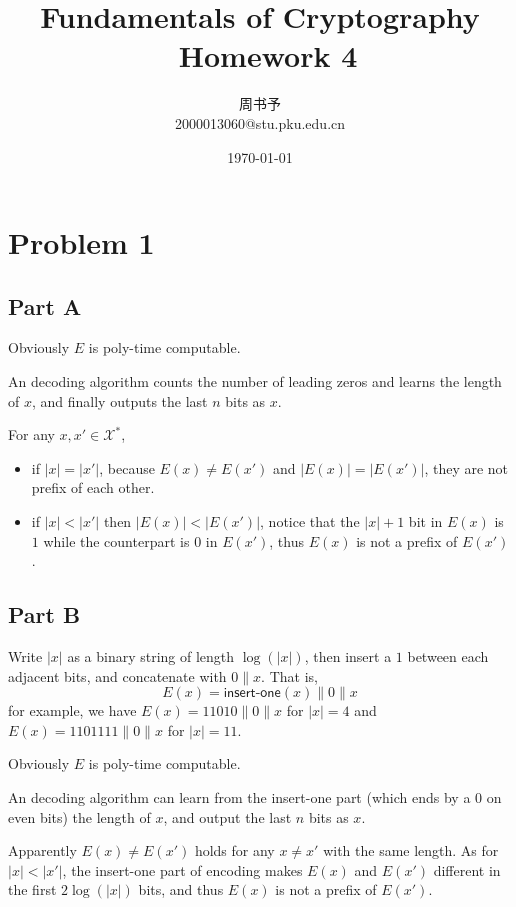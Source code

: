 \documentclass[8pt]{article}
\title{\heiti\zihao{1} Fundamentals  of Cryptography \ Homework 4}
\author{\kaishu\zihao{-3} 周书予\\2000013060@stu.pku.edu.cn}
\date{\today}
\theoremstyle{compact}
\begin{document}
\large
{}
\pagestyle{plain}



\maketitle

\section*{Problem 1}
\subsection*{Part A}
Obviously $E$ is poly-time computable.

An decoding algorithm counts the number of leading zeros and learns the length of $x$, and finally outputs the last $n$ bits as $x$.

For any $x, x' \in \mathcal X^*$, \begin{itemize}
	\item if $|x| = |x'|$, because $E(x) \neq E(x')$ and $|E(x)| = |E(x')|$, they are not prefix of each other.
	\item if $|x| < |x'|$ then $|E(x)| < |E(x')|$, notice that the $|x| + 1$ bit in $E(x)$ is $1$ while the counterpart is $0$ in $E(x')$, thus $E(x)$ is not a prefix of $E(x')$.
\end{itemize}

\subsection*{Part B}
Write $|x|$ as a binary string of length $\log(|x|)$, then insert a $1$ between each adjacent bits, and concatenate with $0 \| x$. That is, $$E(x) = \textsf{insert-one}(x) \| 0 \| x$$ for example, we have $E(x) = 11010 \| 0\|x$ for $|x| = 4$ and $E(x) = 1101111 \| 0 \| x$ for $|x| = 11$.

Obviously $E$ is poly-time computable.

An decoding algorithm can learn from the \textsf{insert-one} part (which ends by a $0$ on even bits) the length of $x$, and output the last $n$ bits as $x$.

Apparently $E(x) \neq E(x')$ holds for any $x \neq x'$ with the same length. As for $|x| < |x'|$, the \textsf{insert-one} part of encoding makes $E(x)$ and $E(x')$ different in the first $2\log(|x|)$ bits, and thus $E(x)$ is not a prefix of $E(x')$.
\end{document}

